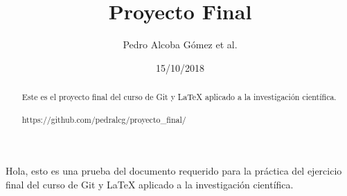 \documentclass[a4paper,11pt]{article}
\begin{document}
\title{Proyecto Final}
\author{Pedro Alcoba Gómez et al.}
\date{15/10/2018}
\maketitle
\begin{abstract}
	Este es el proyecto final del curso de Git y \LaTeX{} aplicado a la investigación científica.\\\\https://github.com/pedralcg/proyecto\_final/  
\end{abstract}
Hola, esto es una prueba del documento requerido para la práctica del ejercicio final del curso de Git y \LaTeX{} aplicado a la investigación científica.
\end{document}
